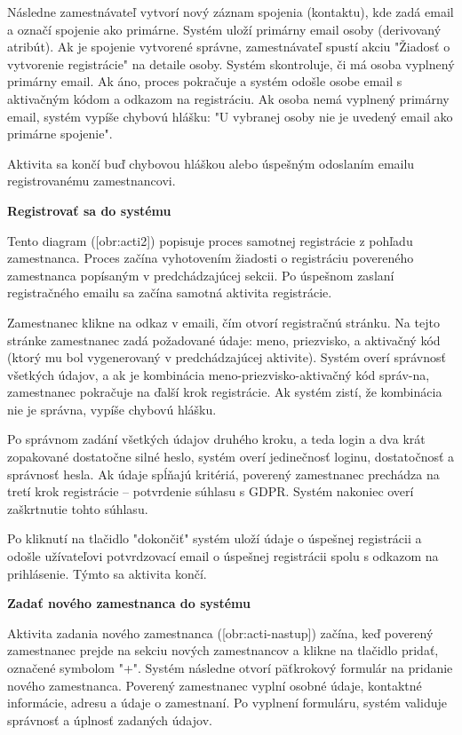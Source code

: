 Následne zamestnávateľ vytvorí nový záznam spojenia (kontaktu), kde zadá email a označí spojenie ako primárne. Systém uloží primárny email osoby (derivovaný atribút). Ak je spojenie vytvorené správne, zamestnávateľ spustí akciu "Žiadosť o vytvorenie registrácie" na detaile osoby. Systém skontroluje, či má osoba vyplnený primárny email. Ak áno, proces pokračuje a systém odošle osobe email s aktivačným kódom a odkazom na registráciu. Ak osoba nemá vyplnený primárny email, systém vypíše chybovú hlášku: "U vybranej osoby nie je uvedený email ako primárne spojenie".

Aktivita sa končí buď chybovou hláškou alebo úspešným odoslaním emailu registrovanému zamestnancovi.

\blank
\start
\setupindenting[no]
\start\bf Registrovať sa do systému\stop
\stop


Tento diagram ([obr:acti2]) popisuje proces samotnej registrácie z pohľadu zamestnanca. Proces začína vyhotovením žiadosti o registráciu povereného zamestnanca popísaným v predchádzajúcej sekcii. Po úspešnom zaslaní registračného emailu sa začína samotná aktivita registrácie.

Zamestnanec klikne na odkaz v emaili, čím otvorí registračnú stránku. Na tejto stránke zamestnanec zadá požadované údaje: meno, priezvisko, a aktivačný kód (ktorý mu bol vygenerovaný v predchádzajúcej aktivite). Systém overí správnosť všetkých údajov, a ak je kombinácia meno-priezvisko-aktivačný kód správ-na, zamestnanec pokračuje na ďalší krok registrácie. Ak systém zistí, že kombinácia nie je správna, vypíše chybovú hlášku.

Po správnom zadání všetkých údajov druhého kroku, a teda login a dva krát zopakované dostatočne silné heslo, systém overí jedinečnosť loginu, dostatočnosť a správnosť hesla. Ak údaje spĺňajú kritériá, poverený zamestnanec prechádza na tretí krok registrácie -- potvrdenie súhlasu s GDPR. Systém nakoniec overí zaškrtnutie tohto súhlasu.

Po kliknutí na tlačidlo "dokončiť" systém uloží údaje o úspešnej registrácii a odošle užívateľovi potvrdzovací email o úspešnej registrácii spolu s odkazom na prihlásenie. Týmto sa aktivita končí.

\blank
\start
\setupindenting[no]
\start\bf Zadať nového zamestnanca do systému\stop
\stop

Aktivita zadania nového zamestnanca ([obr:acti-nastup]) začína, keď poverený zamestnanec prejde na sekciu nových zamestnancov a klikne na tlačidlo pridať, označené symbolom "+". Systém následne otvorí päťkrokový formulár na pridanie nového zamestnanca. Poverený zamestnanec vyplní osobné údaje, kontaktné informácie, adresu a údaje o zamestnaní. Po vyplnení formuláru, systém validuje správnosť a úplnosť zadaných údajov.

